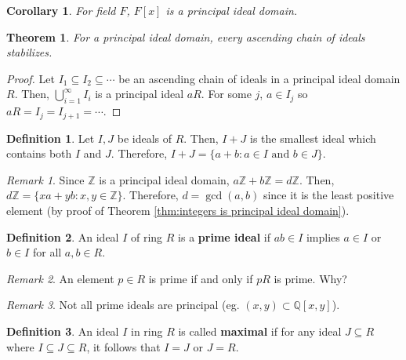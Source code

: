 \documentclass[
    parskip=half,
    toc=flat,
    toc=sectionentrydotfill,
]{scrartcl}  %
\theoremstyle{definition}
\newtheorem{definition}{Definition}[section]
\theoremstyle{plain}
\newtheorem{theorem}{Theorem}[definition]
\newtheorem{corollary}{Corollary}[definition]
\theoremstyle{remark}
\newtheorem{remark}{Remark}[definition]
\begin{document}
\begin{corollary}
    For field $F$, $F[x]$ is a principal ideal domain.
\end{corollary}

\begin{theorem}
    For a principal ideal domain, every ascending chain of ideals stabilizes.
\end{theorem}

\begin{proof}
    Let $I_1\subseteq I_2\subseteq\cdots$ be an ascending chain of ideals in a
    principal ideal domain $R$.
    Then, $\bigcup_{i=1}^\infty I_i$ is a principal ideal $aR$.
    For some $j$, $a\in I_j$ so $aR=I_j=I_{j+1}=\cdots$.
\end{proof}

\begin{definition}
    Let $I,J$ be ideals of $R$. Then, $I+J$ is the smallest ideal which contains
    both $I$ and $J$.
    Therefore, $I+J=\{a+b:a\in I\text{ and }b\in J\}$.
\end{definition}

\begin{remark}
    Since $\mathbb{Z}$ is a principal ideal domain, $a\mathbb{Z}+b\mathbb{Z}=d\mathbb{Z}$.
    Then, $d\mathbb{Z}=\{xa+yb:x,y\in\mathbb{Z}\}$.
    Therefore, $d=\gcd(a,b)$ since it is the least positive element (by proof
    of Theorem \ref{thm:integers is principal ideal domain}).
\end{remark}

\begin{definition}
    An ideal $I$ of ring $R$ is a \textbf{prime ideal} if $ab\in I$ implies
    $a\in I$ or $b\in I$ for all $a,b\in R$.
\end{definition}

\begin{remark}
    An element $p\in R$ is prime if and only if $pR$ is prime.
    Why?
\end{remark}

\begin{remark}
    Not all prime ideals are principal (eg. $(x,y)\subset\mathbb{Q}[x,y]$).
\end{remark}

\begin{definition}
    An ideal $I$ in ring $R$ is called \textbf{maximal} if for any ideal
    $J\subseteq R$ where $I\subseteq J\subseteq R$, it follows that $I=J$ or
    $J=R$.
\end{definition}
\end{document}
